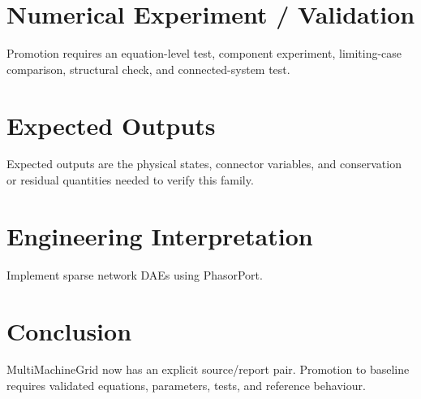 \documentclass[10pt,a4paper]{article}
\begin{document}
\section{Numerical Experiment / Validation}Promotion requires an equation-level test, component experiment, limiting-case comparison, structural check, and connected-system test.
\section{Expected Outputs}Expected outputs are the physical states, connector variables, and conservation or residual quantities needed to verify this family.
\section{Engineering Interpretation}Implement sparse network DAEs using PhasorPort.
\section*{Conclusion}MultiMachineGrid now has an explicit source/report pair. Promotion to baseline requires validated equations, parameters, tests, and reference behaviour.
\end{document}
